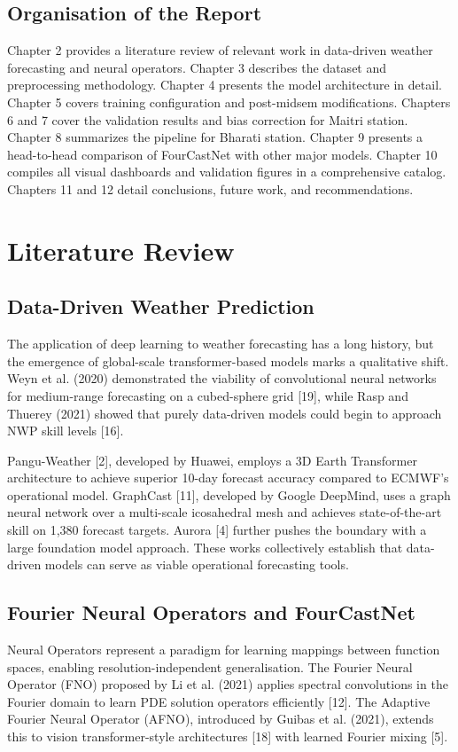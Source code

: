 \documentclass[12pt,titlepage,a4paper]{report}
\begin{document}
\section{Organisation of the Report}
Chapter 2 provides a literature review of relevant work in data-driven weather forecasting and neural operators. Chapter 3 describes the dataset and preprocessing methodology. Chapter 4 presents the model architecture in detail. Chapter 5 covers training configuration and post-midsem modifications. Chapters 6 and 7 cover the validation results and bias correction for Maitri station. Chapter 8 summarizes the pipeline for Bharati station. Chapter 9 presents a head-to-head comparison of FourCastNet with other major models. Chapter 10 compiles all visual dashboards and validation figures in a comprehensive catalog. Chapters 11 and 12 detail conclusions, future work, and recommendations.

\chapter{Literature Review}
\section{Data-Driven Weather Prediction}
The application of deep learning to weather forecasting has a long history, but the emergence of global-scale transformer-based models marks a qualitative shift. Weyn et al. (2020) demonstrated the viability of convolutional neural networks for medium-range forecasting on a cubed-sphere grid [19], while Rasp and Thuerey (2021) showed that purely data-driven models could begin to approach NWP skill levels [16].

Pangu-Weather [2], developed by Huawei, employs a 3D Earth Transformer architecture to achieve superior 10-day forecast accuracy compared to ECMWF's operational model. GraphCast [11], developed by Google DeepMind, uses a graph neural network over a multi-scale icosahedral mesh and achieves state-of-the-art skill on 1,380 forecast targets. Aurora [4] further pushes the boundary with a large foundation model approach. These works collectively establish that data-driven models can serve as viable operational forecasting tools.

\section{Fourier Neural Operators and FourCastNet}
Neural Operators represent a paradigm for learning mappings between function spaces, enabling resolution-independent generalisation. The Fourier Neural Operator (FNO) proposed by Li et al. (2021) applies spectral convolutions in the Fourier domain to learn PDE solution operators efficiently [12]. The Adaptive Fourier Neural Operator (AFNO), introduced by Guibas et al. (2021), extends this to vision transformer-style architectures [18] with learned Fourier mixing [5].
\end{document}
